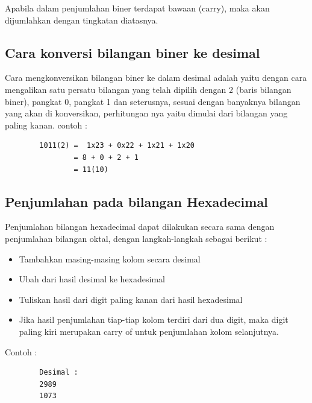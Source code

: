 	Apabila dalam penjumlahan biner terdapat bawaan (carry), maka akan dijumlahkan dengan tingkatan diatasnya.

\subsection {Cara konversi bilangan biner ke desimal}
Cara mengkonversikan bilangan biner ke dalam desimal adalah yaitu dengan cara mengalikan satu persatu bilangan yang telah dipilih dengan 2 (baris bilangan biner), pangkat 0, pangkat 1 dan seterusnya, sesuai dengan banyaknya bilangan yang akan di konversikan, perhitungan nya yaitu dimulai dari bilangan yang paling kanan. 
contoh :
	\begin{verbatim}
		1011(2) =  1x23 + 0x22 + 1x21 + 1x20
				= 8 + 0 + 2 + 1
				= 11(10) 
	\end{verbatim}

\subsection{Penjumlahan pada bilangan Hexadecimal}
Penjumlahan bilangan hexadecimal dapat dilakukan secara sama dengan penjumlahan bilangan oktal, dengan langkah-langkah sebagai berikut :
	\begin{itemize}
		\item Tambahkan masing-masing kolom secara desimal
		\item Ubah dari hasil desimal ke hexadesimal
		\item Tuliskan hasil dari digit paling kanan dari hasil hexadesimal
		\item Jika hasil penjumlahan tiap-tiap kolom terdiri dari dua digit, maka digit paling kiri merupakan carry of untuk penjumlahan kolom selanjutnya.
	\end{itemize}
Contoh :
	\begin{verbatim}
		Desimal :
		2989
		1073
	\end{verbatim}

\cite{wang201140}
\cite{brent1970addition}
\cite{detmer2001introduction}
\cite{nurhayati2010aritmatik}
\cite{dosen2013matematika}

